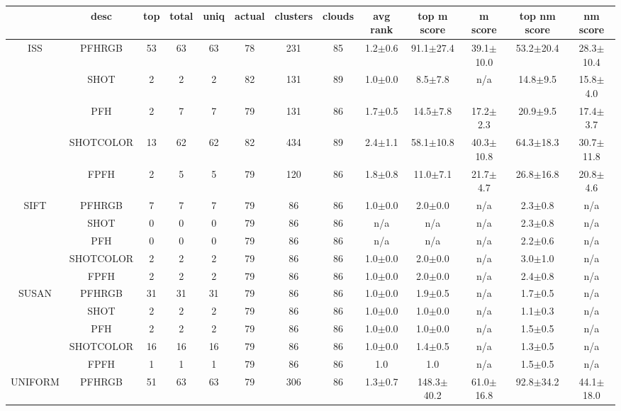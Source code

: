 \documentclass[11pt,a4paper]{kth-mag}
\begin{document}
\begin{landscape}
  \begin{table}
    \begin{tabular}{cc|ccccccccccc}
      & desc & top & total & uniq & actual & clusters & clouds & avg rank & top m score & m score & top nm score & nm score\\\hline
      \multirow{5}{*}{ISS} & PFHRGB & 53 & 63 & 63 & 78 & 231 & 85 & 1.2$\pm$0.6 & 91.1$\pm$27.4 & 39.1$\pm$10.0 & 53.2$\pm$20.4 & 28.3$\pm$10.4\\
      &SHOT & 2 & 2 & 2 & 82 & 131 & 89 & 1.0$\pm$0.0 & 8.5$\pm$7.8 & n/a & 14.8$\pm$9.5 & 15.8$\pm$4.0\\
      &PFH & 2 & 7 & 7 & 79 & 131 & 86 & 1.7$\pm$0.5 & 14.5$\pm$7.8 & 17.2$\pm$2.3 & 20.9$\pm$9.5 & 17.4$\pm$3.7\\
      &SHOTCOLOR & 13 & 62 & 62 & 82 & 434 & 89 & 2.4$\pm$1.1 & 58.1$\pm$10.8 & 40.3$\pm$10.8 & 64.3$\pm$18.3 & 30.7$\pm$11.8\\
      &FPFH & 2 & 5 & 5 & 79 & 120 & 86 & 1.8$\pm$0.8 & 11.0$\pm$7.1 & 21.7$\pm$4.7 & 26.8$\pm$16.8 & 20.8$\pm$4.6\\
      \hline\multirow{5}{*}{SIFT} & PFHRGB & 7 & 7 & 7 & 79 & 86 & 86 & 1.0$\pm$0.0 & 2.0$\pm$0.0 & n/a & 2.3$\pm$0.8 & n/a\\
      &SHOT & 0 & 0 & 0 & 79 & 86 & 86 & n/a & n/a & n/a & 2.3$\pm$0.8 & n/a\\
      &PFH & 0 & 0 & 0 & 79 & 86 & 86 & n/a & n/a & n/a & 2.2$\pm$0.6 & n/a\\
      &SHOTCOLOR & 2 & 2 & 2 & 79 & 86 & 86 & 1.0$\pm$0.0 & 2.0$\pm$0.0 & n/a & 3.0$\pm$1.0 & n/a\\
      &FPFH & 2 & 2 & 2 & 79 & 86 & 86 & 1.0$\pm$0.0 & 2.0$\pm$0.0 & n/a & 2.4$\pm$0.8 & n/a\\
      \hline\multirow{5}{*}{SUSAN} & PFHRGB & 31 & 31 & 31 & 79 & 86 & 86 & 1.0$\pm$0.0 & 1.9$\pm$0.5 & n/a & 1.7$\pm$0.5 & n/a\\
      &SHOT & 2 & 2 & 2 & 79 & 86 & 86 & 1.0$\pm$0.0 & 1.0$\pm$0.0 & n/a & 1.1$\pm$0.3 & n/a\\
      &PFH & 2 & 2 & 2 & 79 & 86 & 86 & 1.0$\pm$0.0 & 1.0$\pm$0.0 & n/a & 1.5$\pm$0.5 & n/a\\
      &SHOTCOLOR & 16 & 16 & 16 & 79 & 86 & 86 & 1.0$\pm$0.0 & 1.4$\pm$0.5 & n/a & 1.3$\pm$0.5 & n/a\\
      &FPFH & 1 & 1 & 1 & 79 & 86 & 86 & 1.0 & 1.0 & n/a & 1.5$\pm$0.5 & n/a\\
      \hline\multirow{5}{*}{UNIFORM} & PFHRGB & 51 & 63 & 63 & 79 & 306 & 86 & 1.3$\pm$0.7 & 148.3$\pm$40.2 & 61.0$\pm$16.8 & 92.8$\pm$34.2 & 44.1$\pm$18.0\\

\end{tabular}
\end{table}
\end{landscape}
\end{document}

